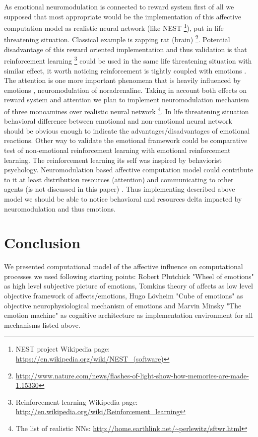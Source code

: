 As emotional neuromodulation is connected to reward system \cite{neuromodulatory, emotionsbraintorobot, primer_affect_psychology, appraisal_considered_as_a_process, computationalmodelsemotion, dont_worry_be_happy} first of all we supposed that most appropriate would be the implementation of this affective computation model as realistic neural network (like NEST \footnote{NEST project Wikipedia page: \url{https://en.wikipedia.org/wiki/NEST_(software)}}), put in life threatening situation. Classical example is zapping rat (brain) \footnote{\url{http://www.nature.com/news/flashes-of-light-show-how-memories-are-made-1.15330}}. Potential disadvantage of this reward oriented implementation and thus validation is that reinforcement learning  \footnote{Reinforcement learning Wikipedia page: \url{http://en.wikipedia.org/wiki/Reinforcement_learning}} could be used in the same life threatening situation with similar effect, it worth noticing reinforcement is tightly coupled with emotions \cite{roleOfReinforcement}. The attention is one more important phenomena that is heavily influenced by emotions \cite{neuromodulatory, on_role_of_emotion, emotionsbraintorobot}, neuromodulation of noradrenaline. Taking in account both effects on reward system and attention we plan to implement neuromodulation mechanism of three monoamines over realistic neural network \footnote{The list of realistic NNs: \url{http://home.earthlink.net/~perlewitz/sftwr.html}}. In life threatening situation behavioral difference between emotional and non-emotional neural network should be obvious enough to indicate the advantages/disadvantages of emotional reactions. Other way to validate the emotional framework could be comparative test of non-emotional reinforcement learning with emotional reinforcement learning. The reinforcement learning its self was inspired by behaviorist psychology. Neuromodulation based affective computation model could contribute to it at least distribution resources (attention) and communicating to other agents (is not discussed in this paper) \cite{on_role_of_emotion}. Thus implementing described above model we should be able to notice behavioral and resources delta impacted by neuromodulation and thus emotions.

\section{Conclusion}

We presented computational model of the affective influence on computational processes we used following starting points: Robert Plutchick "Wheel of emotions" \cite{natureofemotions, senticcomputing} as high level subjective picture of emotions, Tomkins theory of affects \cite{primer_affect_psychology} as low level objective framework of affects/emotions, Hugo L\"{o}vheim "Cube of emotions" \cite{cubeofemotions} as objective neurophysiological mechanism of emotions and Marvin Minsky "The emotion machine" \cite{emotionmachine} as cognitive architecture as implementation environment for all mechanisms listed above.

